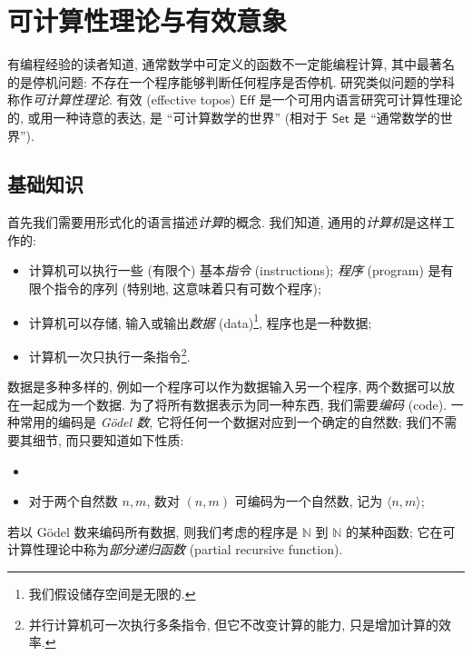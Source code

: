\section{可计算性理论与有效意象}

有编程经验的读者知道, 通常数学中可定义的函数不一定能编程计算, 其中最著名的是停机问题: 不存在一个程序能够判断任何程序是否停机. 研究类似问题的学科称作\emph{可计算性理论}. 有效\topos{} (effective topos) $\mathsf {Eff}$ 是一个可用内语言研究可计算性理论的\topos{}, 或用一种诗意的表达, 是 ``可计算数学的世界'' (相对于 $\mathsf {Set}$ 是 ``通常数学的世界'').

\subsection{基础知识}

首先我们需要用形式化的语言描述\emph{计算}的概念. 我们知道, 通用的\emph{计算机}是这样工作的:
\begin{itemize}
	\item 计算机可以执行一些 (有限个) 基本\emph{指令} (instructions); \emph{程序} (program) 是有限个指令的序列 (特别地, 这意味着只有可数个程序);
	\item 计算机可以存储, 输入或输出\emph{数据} (data)\footnote{我们假设储存空间是无限的.}, 程序也是一种数据;
	\item 计算机一次只执行一条指令\footnote{并行计算机可一次执行多条指令, 但它不改变计算的能力, 只是增加计算的效率.}.
\end{itemize}

数据是多种多样的, 例如一个程序可以作为数据输入另一个程序, 两个数据可以放在一起成为一个数据. 为了将所有数据表示为同一种东西, 我们需要\emph{编码} (code). 一种常用的编码是 \emph{G\"odel 数}, 它将任何一个数据对应到一个确定的自然数; 我们不需要其细节, 而只要知道如下性质:
\begin{itemize}
	\item 
	\item 对于两个自然数 $n,m$, 数对 $(n,m)$ 可编码为一个自然数, 记为 $\langle n,m \rangle$;
\end{itemize}

若以 G\"odel 数来编码所有数据, 则我们考虑的程序是 $\mathbb{N}$ 到 $\mathbb{N}$ 的某种函数; 它在可计算性理论中称为\emph{部分递归函数} (partial recursive function).

